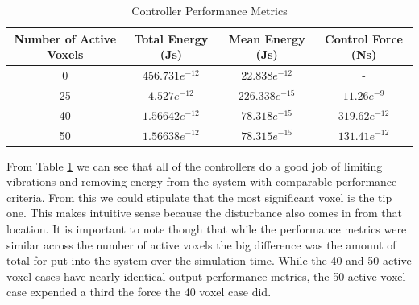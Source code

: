 \documentclass[11pt]{ucthesis}
\begin{document}
\begin{table}[thpb]
\caption{Controller Performance Metrics}
\label{tab:energy}
\begin{center}
\begin{tabular}{|c||c||c||c|}
\hline
Number of Active Voxels&Total Energy (Js)&Mean Energy (Js)&Control Force (Ns)\\
\hline
0 &$456.731e^{-12}$&$22.838e^{-12}$&-\\
\hline
25&$4.527e^{-12}$&$226.338e^{-15}$&$11.26e^{-9}$\\
\hline
40&$1.56642e^{-12}$&$78.318e^{-15}$&$319.62e^{-12}$\\
\hline
50&$1.56638e^{-12}$&$78.315e^{-15}$&$131.41e^{-12}$\\
\hline
\end{tabular}
\end{center}
\end{table}

From Table \ref{tab:energy} we can see that all of the controllers do a good job of limiting vibrations and removing energy from the system with comparable performance criteria. From this we could stipulate that the most significant voxel is the tip one. This makes intuitive sense because the disturbance also comes in from that location. It is important to note though that while the performance metrics were similar across the number of active voxels the big difference was the amount of total for put into the system over the simulation time. While the 40 and 50 active voxel cases have nearly identical output performance metrics, the 50 active voxel case expended a third the force the 40 voxel case did.
\end{document}
